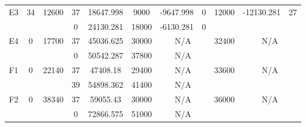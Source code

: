 \begin{sidewaystable}
\begin{tabular}{c||c|c||c|c|c|c|c||c|c|c}
         &
        
      \\
      \hline
      \multirow{2}{*}{E3} &
      \multirow{2}{*}{34} &
      \multirow{2}{*}{12600} &
      37 &
      18647.998 &
      9000 &
        -9647.998 &
        0 &
      \multirow{2}{*}{12000} &
        \multirow{2}{*}{-12130.281} &
        \multirow{2}{*}{27}
      \\
      \cline{4-8}
       &
       &
       &
      0 &
      24130.281 &
      18000 &
        -6130.281 &
        0 &
      
         &
        
      \\
      \hline
      \multirow{2}{*}{E4} &
      \multirow{2}{*}{0} &
      \multirow{2}{*}{17700} &
      37 &
      45036.625 &
      30000 &
        \multicolumn{2}{|c||}{N/A} &
      \multirow{2}{*}{32400} &
        \multicolumn{2}{c}{\multirow{2}{*}{N/A}}
      \\
      \cline{4-8}
       &
       &
       &
      0 &
      50542.287 &
      37800 &
        \multicolumn{2}{|c||}{N/A} &
      
        
      \\
      \hline
      \multirow{2}{*}{F1} &
      \multirow{2}{*}{0} &
      \multirow{2}{*}{22140} &
      37 &
      47408.18 &
      29400 &
        \multicolumn{2}{|c||}{N/A} &
      \multirow{2}{*}{33600} &
        \multicolumn{2}{c}{\multirow{2}{*}{N/A}}
      \\
      \cline{4-8}
       &
       &
       &
      39 &
      54898.362 &
      41400 &
        \multicolumn{2}{|c||}{N/A} &
      
        
      \\
      \hline
      \multirow{2}{*}{F2} &
      \multirow{2}{*}{0} &
      \multirow{2}{*}{38340} &
      37 &
      59055.43 &
      30000 &
        \multicolumn{2}{|c||}{N/A} &
      \multirow{2}{*}{36000} &
        \multicolumn{2}{c}{\multirow{2}{*}{N/A}}
      \\
      \cline{4-8}
       &
       &
       &
      0 &
      72866.575 &
      51000 &
        \multicolumn{2}{|c||}{N/A} &
      
        
      \\
\end{tabular}
\label{table:RDS2.txt-6678.tex} 
\end{sidewaystable}